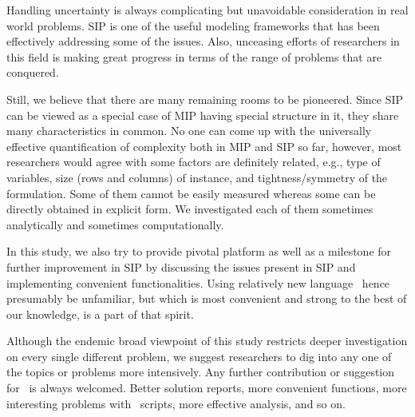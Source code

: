 Handling uncertainty is always complicating but unavoidable consideration in real world problems. SIP is one of the useful modeling frameworks that has been effectively addressing some of the issues. Also, unceasing efforts of researchers in this field is making great progress in terms of the range of problems that are conquered. 

Still, we believe that there are many remaining rooms to be pioneered. Since SIP can be viewed as a special case of MIP having special structure in it, they share many characteristics in common. No one can come up with the universally effective quantification of complexity both in MIP and SIP so far, however, most researchers would agree with some factors are definitely related, e.g., type of variables, size (rows and columns) of instance, and tightness/symmetry of the formulation. Some of them cannot be easily measured whereas some can be directly obtained in explicit form. We investigated each of them sometimes analytically and sometimes computationally.

In this study, we also try to provide pivotal platform as well as a milestone for further improvement in SIP by discussing the issues present in SIP and implementing convenient functionalities. Using relatively new language \julia\ hence presumably be unfamiliar, but which is most convenient and strong to the best of our knowledge, is a part of that spirit. 

Although the endemic broad viewpoint of this study restricts deeper investigation on every single different problem, we suggest researchers to dig into any one of the topics or problems more intensively. Any further contribution or suggestion for \siplibtwo\ is always welcomed. Better solution reports, more convenient functions, more interesting problems with \julia\ scripts, more effective analysis, and so on.

